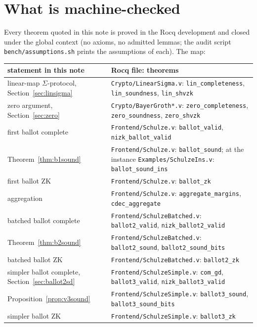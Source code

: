 \documentclass[11pt,a4paper]{article}
\newcommand{\rocq}[1]{\texttt{#1}}
\theoremstyle{remark}
\begin{document}
\section{What is machine-checked}\label{sec:mech}
Every theorem quoted in this note is proved in the Rocq development and
closed under the global context (no axioms, no admitted lemmas; the audit
script \rocq{bench/assumptions.sh} prints the assumptions of each). The
map:
\begin{center}
\footnotesize
\begin{tabularx}{\textwidth}{@{}l>{\raggedright\arraybackslash}X@{}}
  \toprule
  statement in this note & Rocq file: theorems \\
  \midrule
  linear-map $\Sigma$-protocol, Section~\ref{sec:linsigma} & \rocq{Crypto/LinearSigma.v}: \rocq{lin\_completeness}, \rocq{lin\_soundness}, \rocq{lin\_shvzk} \\
  zero argument, Section~\ref{sec:zero} & \rocq{Crypto/BayerGroth*.v}: \rocq{zero\_completeness}, \rocq{zero\_soundness}, \rocq{zero\_shvzk} \\
  first ballot complete & \rocq{Frontend/Schulze.v}: \rocq{ballot\_valid}, \rocq{nizk\_ballot\_valid} \\
  Theorem~\ref{thm:b1sound} & \rocq{Frontend/Schulze.v}: \rocq{ballot\_sound}; at the instance \rocq{Examples/SchulzeIns.v}: \rocq{ballot\_sound\_ins} \\
  first ballot ZK & \rocq{Frontend/Schulze.v}: \rocq{ballot\_zk} \\
  aggregation & \rocq{Frontend/Schulze.v}: \rocq{aggregate\_margins}, \rocq{cdec\_aggregate} \\
  batched ballot complete & \rocq{Frontend/SchulzeBatched.v}: \rocq{ballot2\_valid}, \rocq{nizk\_ballot2\_valid} \\
  Theorem~\ref{thm:b2sound} & \rocq{Frontend/SchulzeBatched.v}: \rocq{ballot2\_sound}, \rocq{ballot2\_sound\_bits} \\
  batched ballot ZK & \rocq{Frontend/SchulzeBatched.v}: \rocq{ballot2\_zk} \\
  simpler ballot complete, Section~\ref{sec:ballot2sd} & \rocq{Frontend/SchulzeSimple.v}: \rocq{com\_gd}, \rocq{ballot3\_valid}, \rocq{nizk\_ballot3\_valid} \\
  Proposition~\ref{prop:v3sound} & \rocq{Frontend/SchulzeSimple.v}: \rocq{ballot3\_sound}, \rocq{ballot3\_sound\_bits} \\
  simpler ballot ZK & \rocq{Frontend/SchulzeSimple.v}: \rocq{ballot3\_zk} \\

\end{tabularx}
\end{center}
\end{document}
